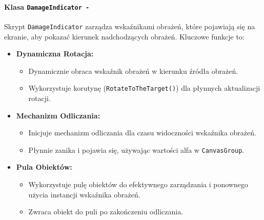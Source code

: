 \paragraph{Klasa \texttt{DamageIndicator -}}
Skrypt \texttt{DamageIndicator} zarządza wskaźnikami obrażeń, które pojawiają się na ekranie, aby pokazać kierunek nadchodzących obrażeń. Kluczowe funkcje to:
\begin{itemize}
\item \textbf{Dynamiczna Rotacja:}
\begin{itemize}
\item Dynamicznie obraca wskaźnik obrażeń w kierunku źródła obrażeń.
\item Wykorzystuje korutynę (\texttt{RotateToTheTarget()}) dla płynnych aktualizacji rotacji.
\end{itemize}
\item \textbf{Mechanizm Odliczania:}
\begin{itemize}
\item Inicjuje mechanizm odliczania dla czasu widoczności wskaźnika obrażeń.
\item Płynnie zanika i pojawia się, używając wartości alfa w \texttt{CanvasGroup}.
\end{itemize}
\item \textbf{Pula Obiektów:}
\begin{itemize}
\item Wykorzystuje pulę obiektów do efektywnego zarządzania i ponownego użycia instancji wskaźnika obrażeń.
\item Zwraca obiekt do puli po zakończeniu odliczania.
\end{itemize}
\end{itemize}


